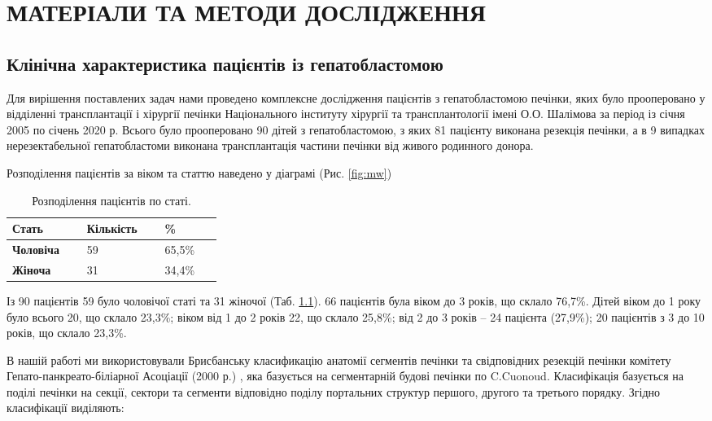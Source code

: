 \chapter{МАТЕРІАЛИ ТА МЕТОДИ ДОСЛІДЖЕННЯ}
\section{Клінічна характеристика пацієнтів із гепатобластомою}
Для вирішення поставлених задач нами проведено комплексне дослідження пацієнтів з гепатобластомою печінки, яких було прооперовано у відділенні трансплантації і хірургії печінки Національного інституту хірургії та трансплантології імені О.О. Шалімова за період із січня 2005 по січень 2020 р. Всього було прооперовано 90 дітей з гепатобластомою, з яких 81 пацієнту виконана резекція печінки, а в 9 випадках нерезектабельної гепатобластоми виконана трансплантація частини печінки від живого родинного донора. 

Розподілення пацієнтів за віком та статтю наведено у діаграмі (Рис. \ref{fig:mw})

\begin{table}[]
\centering
\caption{Розподілення пацієнтів по статі.}
\label{tab:sex}
\begin{tabular}{|p{0.1\linewidth}|p{0.1\linewidth}|p{0.1\linewidth}|}
\hline
\textbf{Стать}    & {\color[HTML]{231F20} \textbf{Кількість}} & {\color[HTML]{231F20} \textbf{\%}} \\ \hline
\textbf{Чоловіча} & 59                                        & 65,5\%                            \\ \hline
\textbf{Жіноча}   & 31                                        & 34,4\%                            \\ \hline
\end{tabular}
\end{table}

Із 90 пацієнтів 59 було чоловічої статі та 31 жіночої (Таб. \ref{tab:sex}). 66 пацієнтів була віком до 3 років, що склало 76,7\%. Дітей віком до 1 року було всього 20, що склало 23,3\%; віком від 1 до 2 років 22, що склало 25,8\%; від 2 до 3 років – 24 пацієнта (27,9\%); 20 пацієнтів з 3 до 10 років, що склало 23,3\%.

В нашій работі ми використовували Брисбанську класификацію анатомії сегментів печінки та свідповідних резекцій печінки комітету Гепато-панкреато-біліарної Асоціації (2000 р.) \cite{pmid24852330}, яка базується на сегментарній будові печінки по C.Cuonoud. Класифікація базується на поділі печінки на секції, сектори та сегменти відповідно поділу портальних структур першого, другого та третього порядку. Згідно класифікації виділяють: 

